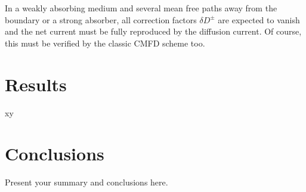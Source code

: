 In a weakly absorbing medium and several mean free paths away from the boundary or a strong absorber, all correction factors $\delta D^\pm$ are expected to vanish and the net current must be fully reproduced by the diffusion current. Of course, this must be verified by the classic CMFD scheme too.

\section{Results}
\label{sec:res}

xy

\section{Conclusions}
\label{sec:conc}

Present your summary and conclusions here.
